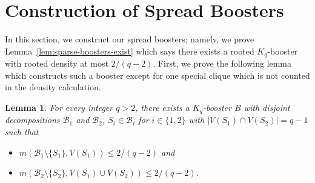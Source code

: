\documentclass[11pt]{article}
\numberwithin{equation}{section}
\newcounter{i}
\theoremstyle{plain}
\newtheorem{lem}[thm]{Lemma}
\theoremstyle{plain} %
\theoremstyle{definition}
\newcommand{\cB}{\mathcal{B}}
\begin{document}
\section{Construction of Spread Boosters}\label{sec:spread-boosters}


In this section, we construct our spread boosters; namely, we prove Lemma~\ref{lem:sparse-boosters-exist} which says there exists a rooted $K_q$-booster with rooted density at most $2/(q-2)$. First, we prove the following lemma which constructs such a booster except for one special clique which is not counted in the density calculation. 

\begin{lem}\label{lem:spread-booster-w-special-clique}
    For every integer $q > 2$, there exists a $K_q$-booster $B$ with disjoint decompositions $\cB_1$ and $\cB_2$, $S_i \in \cB_i$ for $i \in \{1,2\}$ with $|V(S_1) \cap V(S_2)| = q - 1$ such that
    \begin{itemize}
        \item $m(\cB_1\setminus\{S_1\}, V(S_1)) \leq 2 / (q-2)$ and
        \item $m(\cB_2\setminus\{S_2\}, V(S_1) \cup V(S_2)) \leq 2/(q - 2)$.
    \end{itemize}
\end{lem}
\end{document}
